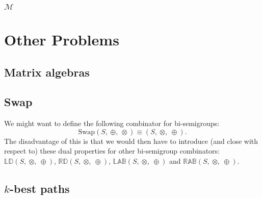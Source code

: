 \documentclass[10pt]{report}
\newcommand{\propname}[1]{{\mathbb{#1}}}
\begin{document}





\subsection{$\mathcal{M}$} 






\chapter{Other Problems} 

\section{Matrix algebras}

\section{Swap}

We might want to define the following combinator for bi-semigroups:
\[ 
\mathrm{Swap}(S,\ \oplus,\ \otimes)   
   \equiv 
   (S,\ \otimes,\ \oplus). 
\] 
The disadvantage of this is that we would then have to introduce 
(and close with respect to) these dual properties for other bi-semigroup combinators: $\propname{LD}(S,\ \otimes,\ \oplus)$, $\propname{RD}(S,\ \otimes,\ \oplus)$, $\propname{LAB}(S,\ \otimes,\ \oplus)$ and $\propname{RAB}(S,\ \otimes,\ \oplus)$.

\section{$k$-best paths}


\end{document}
